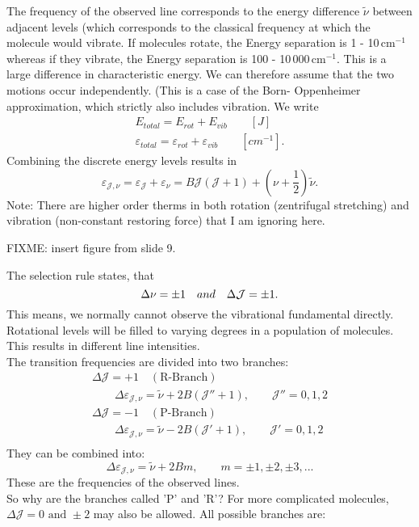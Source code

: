\documentclass[a4paper,fleqn]{article}
\renewcommand{\epsilon}{\varepsilon}  %
\begin{document}
The frequency of the observed line corresponds to the energy difference $\tilde{\nu}$ between adjacent levels (which corresponds to the classical frequency at which the molecule would vibrate. If molecules rotate, the Energy separation is 1 - 10\,cm$^{-1}$ whereas if they vibrate, the Energy separation is 100 - 10\,000\,cm$^{-1}$. This is a large difference in characteristic energy. We can therefore assume that the two motions occur independently.
 (This is a case of the Born- Oppenheimer approximation, which strictly also includes vibration. We write
 \begin{gather}
E_{total} = E_{rot} + E_{vib} \qquad \left[J\right]  \\
\epsilon_{total} = \epsilon_{rot} + \epsilon_{vib} \qquad \left[cm^{-1}\right].
 \end{gather}
Combining the discrete energy levels results in
\begin{equation}
\epsilon_{\mathcal{J},\nu} = \epsilon_{\mathcal{J}} + \epsilon_{\nu} = B \mathcal{J} (\mathcal{J} + 1) + (\nu + \frac{1}{2})\tilde{\nu}.
\end{equation}
Note: There are higher order therms in both rotation (zentrifugal stretching) and vibration (non-constant restoring force) that I am ignoring here. \par
 FIXME: insert figure from slide 9. \par
 The selection rule states, that
 \begin{equation}
\Delta \nu = \pm 1 \text \quad {and} \quad \Delta \mathcal{J} = \pm 1.
\end{equation}
This means, we normally cannot observe the vibrational fundamental directly. Rotational levels will be filled to varying degrees in a population of molecules. This results in different line intensities. \\
The transition frequencies are divided into two branches:
\begin{gather*}
\Delta \mathcal{J} = +1 \quad (\text{R-Branch}) \\
\qquad \Delta \epsilon_{\mathcal{J},\nu} = \tilde{\nu} + 2 B ( \mathcal{J''} + 1), 
	\qquad \mathcal{J''} = 0, 1, 2  \\
\Delta \mathcal{J} = -1 \quad (\text{P-Branch}) \\
\qquad \Delta \epsilon_{\mathcal{J},\nu} = \tilde{\nu} - 2 B ( \mathcal{J'} + 1) , 
	\qquad \mathcal{J'} = 0, 1, 2  \\ 
\end{gather*}
 They can be combined into: 
 \begin{equation}
\Delta \epsilon_{\mathcal{J},\nu} = \tilde{\nu} + 2 B m , 
	\qquad m = \pm1, \pm2, \pm3, ...
\end{equation}
These are the frequencies of the observed lines. \\
So why are the branches called 'P' and 'R'? For more complicated molecules, $\Delta \mathcal{J} = 0 \text{ and } \pm 2$ may also be allowed. All possible branches are:
\end{document}
